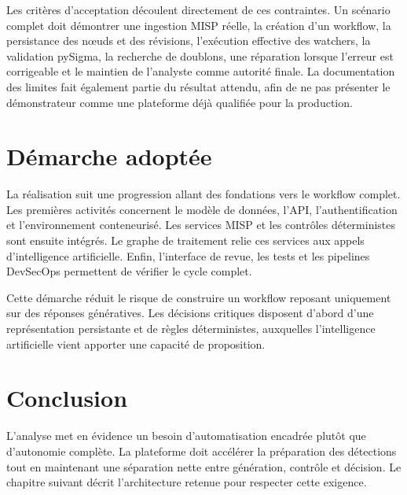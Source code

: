 Les critères d'acceptation découlent directement de ces contraintes. Un scénario complet doit démontrer une ingestion MISP réelle, la création d'un workflow, la persistance des nœuds et des révisions, l'exécution effective des watchers, la validation pySigma, la recherche de doublons, une réparation lorsque l'erreur est corrigeable et le maintien de l'analyste comme autorité finale. La documentation des limites fait également partie du résultat attendu, afin de ne pas présenter le démonstrateur comme une plateforme déjà qualifiée pour la production.

\section{Démarche adoptée}

La réalisation suit une progression allant des fondations vers le workflow complet. Les premières activités concernent le modèle de données, l'API, l'authentification et l'environnement conteneurisé. Les services MISP et les contrôles déterministes sont ensuite intégrés. Le graphe de traitement relie ces services aux appels d'intelligence artificielle. Enfin, l'interface de revue, les tests et les pipelines DevSecOps permettent de vérifier le cycle complet.

Cette démarche réduit le risque de construire un workflow reposant uniquement sur des réponses génératives. Les décisions critiques disposent d'abord d'une représentation persistante et de règles déterministes, auxquelles l'intelligence artificielle vient apporter une capacité de proposition.

\section{Conclusion}

L'analyse met en évidence un besoin d'automatisation encadrée plutôt que d'autonomie complète. La plateforme doit accélérer la préparation des détections tout en maintenant une séparation nette entre génération, contrôle et décision. Le chapitre suivant décrit l'architecture retenue pour respecter cette exigence.